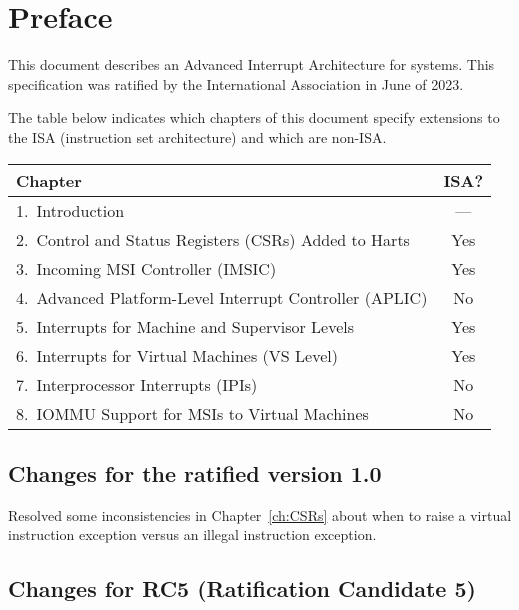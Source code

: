 
\chapter{Preface}

This document describes an Advanced Interrupt Architecture
for {\RISCV} systems.
This specification was ratified by the
{\RISCV} International Association in June of 2023.

The table below indicates which chapters
of this document specify extensions to the
{\RISCV} ISA (instruction set architecture) and which are non-ISA.

{
\begin{table}[hbt]
\centering
\begin{tabular}{|l|c|}
\hline
Chapter                                                  & ISA? \\
\hline
\hline
1.\ Introduction                                         & ---  \\
2.\ Control and Status Registers (CSRs) Added to Harts   & Yes  \\
3.\ Incoming MSI Controller (IMSIC)                      & Yes  \\
4.\ Advanced Platform-Level Interrupt Controller (APLIC) & No   \\
5.\ Interrupts for Machine and Supervisor Levels         & Yes  \\
6.\ Interrupts for Virtual Machines (VS Level)           & Yes  \\
7.\ Interprocessor Interrupts (IPIs)                     & No   \\
8.\ IOMMU Support for MSIs to Virtual Machines           & No   \\
\hline
\end{tabular}
\end{table}
}

\section*{Changes for the ratified version 1.0}

Resolved some inconsistencies in Chapter~\ref{ch:CSRs}
about when to raise a virtual instruction exception
versus an illegal instruction exception.

\section*{Changes for RC5 (Ratification Candidate 5)}

